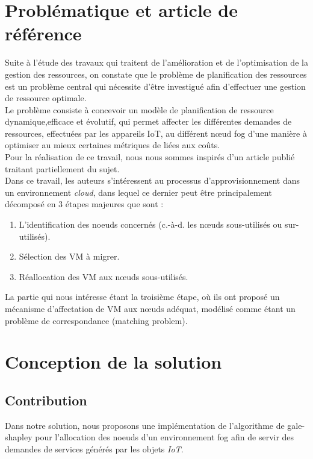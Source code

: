 \section{Problématique et article de référence}
Suite à l’étude des travaux qui traitent de l’amélioration et de l’optimisation de la gestion des ressources, on constate que le problème de planification des ressources est un problème central qui nécessite d'être investigué afin d’effectuer une gestion de ressource optimale. \\
Le problème consiste à concevoir un modèle de planification de ressource dynamique,efficace et évolutif, qui permet affecter les différentes demandes de ressources, effectuées par les appareils IoT, au différent nœud fog d’une manière à optimiser au mieux certaines métriques de liées aux coûts.\\
Pour la réalisation de ce travail, nous nous sommes inspirés d’un article publié  traitant partiellement du sujet\cite{jing2016}. \\
Dans ce travail, les auteurs s’intéressent au processus d'approvisionnement dans un environnement \emph{cloud}, dans lequel ce dernier peut être principalement décomposé en 3 étapes majeures que sont : 
\begin{enumerate}
    \item L’identification des noeuds concernés (c.-à-d. les nœuds sous-utilisés ou sur-utilisés). 
    \item Sélection des VM à migrer.
    \item Réallocation des VM aux nœuds sous-utilisés.
\end{enumerate}
La partie qui nous intéresse étant la troisième étape,  où ils ont proposé un mécanisme d’affectation de VM aux nœuds adéquat, modélisé comme étant un problème de correspondance (matching problem).
\section{Conception de la solution}
\subsection{Contribution}
Dans notre solution, nous proposons une implémentation de l'algorithme de gale-shapley pour l'allocation des noeuds d'un environnement fog afin de servir des demandes de services générés par les objets \emph{IoT}.
